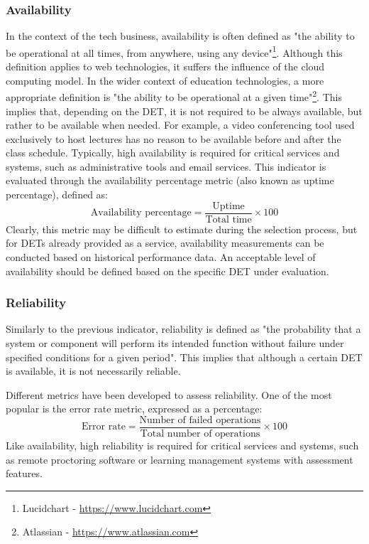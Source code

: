 \subsubsection{Availability}
In the context of the tech business, availability is often defined as "the ability to be operational at all times, from anywhere, using any device"\footnote{Lucidchart - \href{https://www.lucidchart.com/blog/reliability-availability-in-cloud-computing}{https://www.lucidchart.com}}. Although this definition applies to web technologies, it suffers the influence of the cloud computing model. In the wider context of education technologies, a more appropriate definition is "the ability to be operational at a given time"\footnote{Atlassian - \href{https://www.atlassian.com/incident-management/kpis/reliability-vs-availability}{https://www.atlassian.com}}. This implies that, depending on the DET, it is not required to be always available, but rather to be available when needed. For example, a video conferencing tool used exclusively to host lectures has no reason to be available before and after the class schedule. Typically, high availability is required for critical services and systems, such as administrative tools and email services. This indicator is evaluated through the availability percentage metric (also known as uptime percentage), defined as:
\[
    \text{Availability percentage} = \frac{\text{Uptime}}{\text{Total time}} \times 100
\]
Clearly, this metric may be difficult to estimate during the selection process, but for DETs already provided as a service, availability measurements can be conducted based on historical performance data. An acceptable level of availability should be defined based on the specific DET under evaluation.

\subsubsection{Reliability}
Similarly to the previous indicator, reliability is defined as "the probability that a system or component will perform its intended function without failure under specified conditions for a given period". This implies that although a certain DET is available, it is not necessarily reliable. 

Different metrics have been developed to assess reliability. One of the most popular is the error rate metric, expressed as a percentage:
\[
    \text{Error rate} = \frac{\text{Number of failed operations}}{\text{Total number of operations}} \times 100
\]
Like availability, high reliability is required for critical services and systems, such as remote proctoring software or learning management systems with assessment features.

